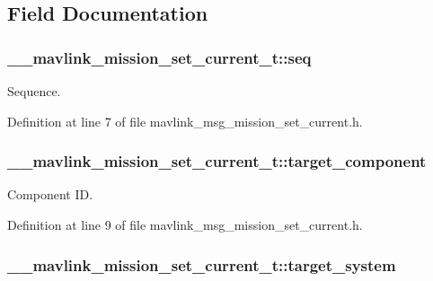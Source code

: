 \subsection{Field Documentation}
\hypertarget{struct____mavlink__mission__set__current__t_add7d7aa3830c71875706ac4e8e5206aa}{
\subsubsection[{seq}]{ \-\_\-\-\_\-mavlink\-\_\-mission\-\_\-set\-\_\-current\-\_\-t\-::seq}}\label{struct____mavlink__mission__set__current__t_add7d7aa3830c71875706ac4e8e5206aa}


Sequence. 



Definition at line 7 of file mavlink\-\_\-msg\-\_\-mission\-\_\-set\-\_\-current.\-h.

\hypertarget{struct____mavlink__mission__set__current__t_a367ad0a39fa1fc6d06ee1aa06a9a6908}{
\subsubsection[{target\-\_\-component}]{ \-\_\-\-\_\-mavlink\-\_\-mission\-\_\-set\-\_\-current\-\_\-t\-::target\-\_\-component}}\label{struct____mavlink__mission__set__current__t_a367ad0a39fa1fc6d06ee1aa06a9a6908}


Component I\-D. 



Definition at line 9 of file mavlink\-\_\-msg\-\_\-mission\-\_\-set\-\_\-current.\-h.

\hypertarget{struct____mavlink__mission__set__current__t_aa9499477334421047ddb7b3d8e4b7794}{
\subsubsection[{target\-\_\-system}]{ \-\_\-\-\_\-mavlink\-\_\-mission\-\_\-set\-\_\-current\-\_\-t\-::target\-\_\-system}}\label{struct____mavlink__mission__set__current__t_aa9499477334421047ddb7b3d8e4b7794}


